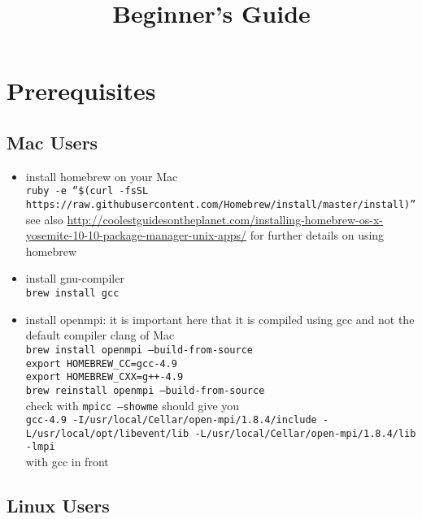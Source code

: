 \documentclass[a4paper,10pt]{article}
\title{Beginner's Guide}
\author{}
\date{}
\begin{document}
\maketitle

\section{Prerequisites}

\subsection*{Mac Users}

\begin{itemize}
\item install homebrew on your Mac\\
         \texttt{ruby -e ``\$(curl -fsSL https://raw.githubusercontent.com/Homebrew/install/\linebreak master/install)''}\\
         see also \url{http://coolestguidesontheplanet.com/installing-homebrew-os-x-yosemite-10-10-package-manager-unix-apps/} for further details on using homebrew
\item install gnu-compiler\\
         \texttt{brew install gcc}
\item install openmpi: it is important here that it is compiled using gcc and not the default compiler clang of Mac\\
         \texttt{brew install openmpi --build-from-source}\\
         \texttt{export HOMEBREW\_CC=gcc-4.9}\\
         \texttt{export HOMEBREW\_CXX=g++-4.9}\\
         \texttt{brew reinstall openmpi --build-from-source}\\
         check with \texttt{mpicc --showme} should give you\\
         \texttt{gcc-4.9 -I/usr/local/Cellar/open-mpi/1.8.4/include -L/usr/local/opt/libevent/lib \linebreak -L/usr/local/Cellar/open-mpi/1.8.4/lib -lmpi}\\
         with gcc in front
\end{itemize}

\subsection*{Linux Users}
\end{document}
